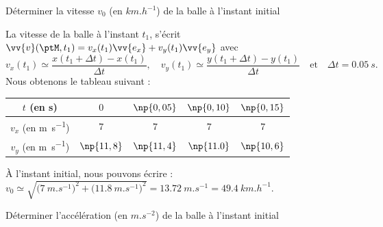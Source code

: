 \debutEntrainement


\begin{enonce}
	Déterminer la vitesse $v_0$ (en $\si{km.h^{-1}}$) de la balle à l'instant initial 
\end{enonce}


\begin{corrigeNewpage}
	La vitesse de la balle %
	à l'instant $t_1$, s'écrit $\vv{v}(\ptM,t_1)=v_x(t_1) \vv{e_x} + v_y(t_1) \vv{e_y}$ 
	avec  
	\[
	v_x(t_1)\simeq\frac{x(t_1+\Delta t)-x(t_1)}{ \Delta t}, \quad 
	v_y(t_1)\simeq\frac{y(t_1+\Delta t)-y(t_1)}{ \Delta t}  \quad\text{et}\quad \Delta t=\SI{0,05}{s}.
	\] 
	Nous obtenons le tableau suivant : \minusSmallskip
\begin{center}
\renewcommand*{\arraystretch}{1.2}
	\begin{tabular}{|c|c|c|c|c|}
		\hline
		$t$ (en \si{s})	& $0$ & $\np{0,05}$ & $\np{0,10}$ & $\np{0,15}$   \\
		\hline
		$v_x$ (en \si{m.s^{-1}})  & $7$ & $7$ & $7$& $7$\\
		\hline
		$v_y$ (en \si{m.s^{-1}})  & $\np{11,8}$ & $\np{11,4}$ & $\np{11.0}$ & $\np{10,6}$ \\
		\hline
	\end{tabular}
\renewcommand*{\arraystretch}{1}
\end{center}
À l'instant initial, nous pouvons écrire : $v_0 \simeq \sqrt{\big(\SI{7}{m.s^{-1}}\big)^2+\big(\SI{11,8}{m.s^{-1}}\big)^2}=\SI{13,72}{m.s^{-1}}=\SI{49,4}{km.h^{-1}}$.
\end{corrigeNewpage}




\begin{enonce}
	Déterminer l'accélération (en $\si{m.s^{-2}}$) de la balle à l'instant initial 
\end{enonce}


